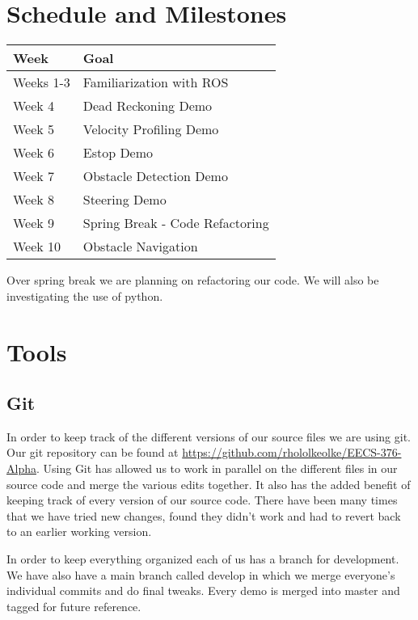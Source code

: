 
\section{Schedule and Milestones}

\begin{longtable}{|l|l|}
  \hline {\bf Week} & {\bf Goal} \\ \hline
Weeks 1-3 & Familiarization with ROS \\ \hline
Week 4 & Dead Reckoning Demo \\ \hline
Week 5 & Velocity Profiling Demo \\ \hline
Week 6 & Estop Demo \\ \hline
Week 7 & Obstacle Detection Demo \\ \hline
Week 8 & Steering Demo \\ \hline
Week 9 & Spring Break - Code Refactoring \\ \hline
Week 10 & Obstacle Navigation \\ \hline
\end{longtable}

Over spring break we are planning on refactoring our code.  We will
also be investigating the use of python.

\section{Tools}

\subsection{Git}

In order to keep track of the different versions of our source files
we are using git.  Our git repository can be found at
\url{https://github.com/rhololkeolke/EECS-376-Alpha}.  Using Git has
allowed us to work in parallel on the different files in our source
code and merge the various edits together.  It also has the added
benefit of keeping track of every version of our source code. There
have been many times that we have tried new changes, found they didn't
work and had to revert back to an earlier working version.

In order to keep everything organized each of us has a branch for
development.  We have also have a main branch called develop in which
we merge everyone's individual commits and do final tweaks. Every
demo is merged into master and tagged for future reference.

